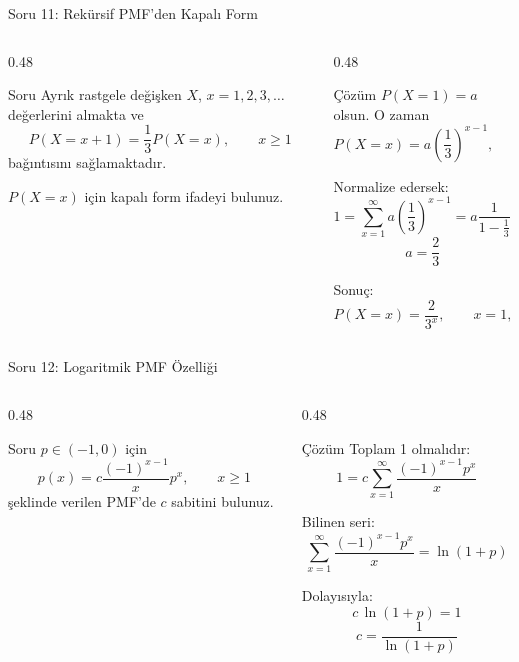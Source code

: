 \documentclass[light]{lutbeamer}
\begin{document}
\begin{frame}{Soru 11: Rekürsif PMF'den Kapalı Form}
\scriptsize
\begin{columns}[T,onlytextwidth]
    \begin{column}{0.48\textwidth}
        \begin{block}{Soru}
            Ayrık rastgele değişken $X$, $x=1,2,3,\ldots$ değerlerini almakta ve
            \[
            P(X=x+1)=\frac{1}{3}P(X=x), \qquad x \ge 1
            \]
            bağıntısını sağlamaktadır.

            \vspace{0.15cm}
            $P(X=x)$ için kapalı form ifadeyi bulunuz.
        \end{block}
    \end{column}
    \begin{column}{0.48\textwidth}
        \begin{exampleblock}{Çözüm}
            $P(X=1)=a$ olsun. O zaman
            \[
            P(X=x)=a\left(\frac{1}{3}\right)^{x-1}, \qquad x \ge 1
            \]

            Normalize edersek:
            \[
            1=\sum_{x=1}^{\infty} a\left(\frac{1}{3}\right)^{x-1}
            =a\frac{1}{1-\frac{1}{3}}=\frac{3a}{2}
            \]
            \[
            a=\frac{2}{3}
            \]

            Sonuç:
            \[
            P(X=x)=\frac{2}{3^x}, \qquad x=1,2,3,\ldots
            \]
        \end{exampleblock}
    \end{column}
\end{columns}
\end{frame}

\begin{frame}{Soru 12: Logaritmik PMF Özelliği}
\scriptsize
\begin{columns}[T,onlytextwidth]
    \begin{column}{0.48\textwidth}
        \begin{block}{Soru}
            $p\in(-1,0)$ için
            \[
            p(x)=c\frac{(-1)^{x-1}}{x}p^x, \qquad x \ge 1
            \]
            şeklinde verilen PMF'de $c$ sabitini bulunuz.
        \end{block}
    \end{column}
    \begin{column}{0.48\textwidth}
        \begin{exampleblock}{Çözüm}
            Toplam 1 olmalıdır:
            \[
            1=c\sum_{x=1}^{\infty}\frac{(-1)^{x-1}p^x}{x}
            \]

            Bilinen seri:
            \[
            \sum_{x=1}^{\infty}\frac{(-1)^{x-1}p^x}{x}=\ln(1+p)
            \]

            Dolayısıyla:
            \[
            c\,\ln(1+p)=1
            \]
            \[
            c=\frac{1}{\ln(1+p)}
            \]
        \end{exampleblock}
    \end{column}
\end{columns}
\end{frame}
\end{document}
